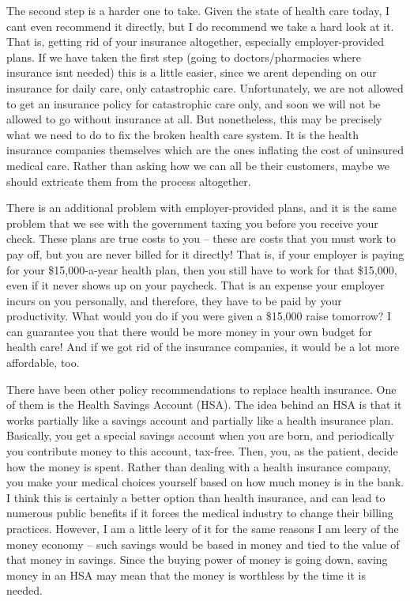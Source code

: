 The second step is a harder one to take. Given the state of health care
today, I can{\textquotesingle}t even recommend it directly, but I do
recommend we take a hard look at it. That is, getting rid of your
insurance altogether, especially employer-provided plans.
 If we have taken the
first step (going to doctors/pharmacies where insurance
isn{\textquotesingle}t needed) this is a little easier, since we
aren{\textquotesingle}t depending on our insurance for daily care, only
catastrophic care.  Unfortunately, we are not allowed to get an
insurance policy for catastrophic care only, and soon we will not be
allowed to go without insurance at all.  But nonetheless, this may be
precisely what we need to do to fix the broken health care system.  It
is the health insurance companies themselves which are the ones
inflating the cost of uninsured medical care.  Rather than asking how
we can all be their customers, maybe we should extricate them from the
process altogether.

There is an additional problem with employer-provided plans, and it
is the same problem that we see with the government taxing you before
you receive your check.  These plans are true costs to you – these are
costs that you must work to pay off, but you are never billed for it
directly!  That is, if your employer is paying for your \$15,000-a-year
health plan, then you still have to work for that \$15,000, even if it
never shows up on your paycheck. That is an expense your employer
incurs on you personally, and therefore,
they
have to be paid by
your productivity. What would you do if you were given a \$15,000 raise
tomorrow?  I can guarantee you that there would be more money in your
own budget for health care!  And if we got rid of the insurance
companies, it would be a lot more affordable, too.

There have been other policy recommendations to replace health
insurance.  One of them is the Health Savings Account (HSA).  The idea
behind an HSA is that it works partially like a savings account and
partially like a health insurance plan.  Basically, you get a special
savings account when you are born, and periodically you contribute
money to this account, tax-free.  Then, you, as the patient, decide how
the money is spent.  Rather than dealing with a health insurance
company, you make your medical choices yourself based on how much money
is in the bank.  I think this is certainly a better option than health
insurance, and can lead to numerous public benefits if it forces the
medical industry to change their billing practices.  However, I am a
little leery of it for the same reasons I am leery of the money economy
– such savings would be based in money and tied to the value of that
money in savings.  Since the buying power of money is going down,
saving money in an HSA may mean that the money is worthless by the time
it is needed.

